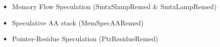 \begin{itemize}


    \item Memory Flow Speculation (SmtxSlampRemed \& SmtxLampRemed)

    \item Speculative AA stack (MemSpecAARemed)


    \item Pointer-Residue Speculation (PtrResidueRemed)
\end{itemize}

